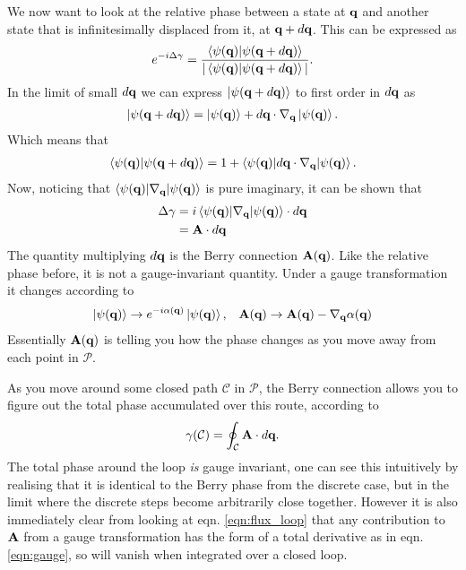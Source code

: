 We now want to look at the relative phase between a state at $\bf q$ and another state that is infinitesimally displaced from it, at $\bf q + d \bf q$. This can be expressed as
\begin{align}
    e^{-i\Delta\gamma} = \frac{\braket{\psi(\bf q)|\psi(\bf q+d\bf q)}}{|\braket{\psi(\bf q)|\psi(\bf q+d\bf q)}|}.
\end{align}
In the limit of small $d\bf q$ we can express $\ket{\psi(\bf q+d\bf q)}$ to first order in $d\bf q$ as
\begin{align}
    \ket{\psi(\bf q+d\bf q)} = \ket{\psi(\bf q)} + d\bf q \cdot \nabla_{\bf q} \ket{\psi(\bf q)}.
\end{align}
Which means that
\begin{align}
    \braket{\psi(\bf q)|\psi(\bf q+d\bf q)} = 1 + \braket{\psi(\bf q) |d\bf q \cdot \nabla _{\bf q}|\psi(\bf q)}.
\end{align}
Now, noticing that $ \braket{\psi(\bf q) | \nabla_{\bf q} |\psi(\bf q)}$ is pure imaginary, it can be shown that
\begin{align}\label{A_def}
    \Delta \gamma &= i \braket{\psi(\bf q) | \nabla_{\bf q} |\psi(\bf q)} \cdot d\bf q \\
    &= \textbf{A} \cdot d\bf q
\end{align}
The quantity multiplying $d\bf q$ is the Berry connection $\textbf{A}(\bf q)$. Like the relative phase before, it is not a gauge-invariant quantity. Under a gauge transformation it changes according to
\begin{align} \label{eqn:gauge}
    \ket{\psi(\bf q)} \rightarrow e^{-i\alpha(\bf q)}\ket{\psi(\bf q)},\;\;\; \textbf{A}(\bf q) \rightarrow \textbf{A}(\bf q) - \nabla _{\bf q} \alpha(\bf q)
\end{align}
Essentially $\textbf{A}(\bf q)$ is telling you how the phase changes as you move away from each point in $\mathcal{P}$. \par
As you move around some closed path $\mathcal C$ in $\mathcal{P}$, the Berry connection allows you to figure out the total phase accumulated over this route, according to
\begin{align} \label{eqn:flux_loop}
    \gamma(\mathcal C) = \oint_{\mathcal C} \textbf{A} \cdot d\bf q.
\end{align}
The total phase around the loop \textit{is} gauge invariant, one can see this intuitively by realising that it is identical to the Berry phase from the discrete case, but in the limit where the discrete steps become arbitrarily close together. However it is also immediately clear from looking at eqn. \ref{eqn:flux_loop} that any contribution to $\bf A$ from a gauge transformation has the form of a total derivative as in eqn. \ref{eqn:gauge}, so will vanish when integrated over a closed loop.


